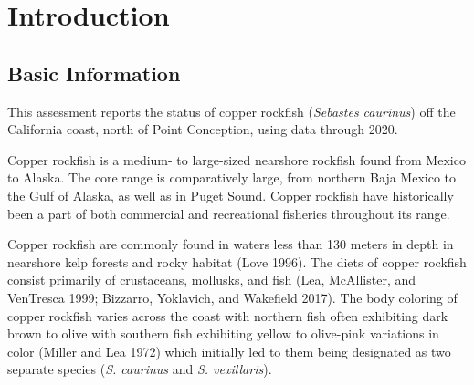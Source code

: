 \documentclass[11pt,
  english,
  a4paper,
]{article}
\begin{document}
\setcounter{table}{0}
\setcounter{figure}{0}

\setlength\parskip{0.5em plus 0.1em minus 0.2em}


\hypertarget{introduction}{%
\section{Introduction}\label{introduction}}

\leavevmode\tagmcend\tagstructend


\hypertarget{basic-information}{%
\subsection{Basic Information}\label{basic-information}}

\leavevmode\tagmcend\tagstructend


This assessment reports the status of copper rockfish (\emph{Sebastes caurinus}) off the California coast, north of Point Conception, using data through 2020.

\leavevmode\tagmcend\tagstructend\par


Copper rockfish is a medium- to large-sized nearshore rockfish found from Mexico to Alaska. The core range is comparatively large, from northern Baja Mexico to the Gulf of Alaska, as well as in Puget Sound. Copper rockfish have historically been a part of both commercial and recreational fisheries throughout its range.

\leavevmode\tagmcend\tagstructend\par


Copper rockfish are commonly found in waters less than 130 meters in depth in nearshore kelp forests and rocky habitat {(Love 1996)\leavevmode\tagmcend\tagstructend}. The diets of copper rockfish consist primarily of crustaceans, mollusks, and fish {(Lea, McAllister, and VenTresca 1999; Bizzarro, Yoklavich, and Wakefield 2017)\leavevmode\tagmcend\tagstructend}. The body coloring of copper rockfish varies across the coast with northern fish often exhibiting dark brown to olive with southern fish exhibiting yellow to olive-pink variations in color {(Miller and Lea 1972)\leavevmode\tagmcend\tagstructend} which initially led to them being designated as two separate species (\emph{S. caurinus} and \emph{S. vexillaris}).
\end{document}
